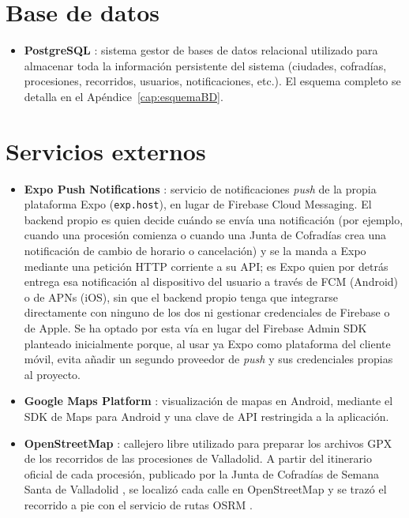 \section{Base de datos}

\begin{itemize}
    \item \textbf{PostgreSQL} \cite{postgresql}: sistema gestor de bases de datos relacional utilizado para almacenar toda la información persistente del sistema (ciudades, cofradías, procesiones, recorridos, usuarios, notificaciones, etc.). El esquema completo se detalla en el Apéndice~\ref{cap:esquemaBD}.
\end{itemize}

\section{Servicios externos}

\begin{itemize}
    \item \textbf{Expo Push Notifications} \cite{expo}: servicio de notificaciones \emph{push} de la propia plataforma Expo (\texttt{exp.host}), en lugar de Firebase Cloud Messaging. El backend propio es quien decide cuándo se envía una notificación (por ejemplo, cuando una procesión comienza o cuando una Junta de Cofradías crea una notificación de cambio de horario o cancelación) y se la manda a Expo mediante una petición HTTP corriente a su API; es Expo quien por detrás entrega esa notificación al dispositivo del usuario a través de FCM (Android) o de APNs (iOS), sin que el backend propio tenga que integrarse directamente con ninguno de los dos ni gestionar credenciales de Firebase o de Apple. Se ha optado por esta vía en lugar del Firebase Admin SDK planteado inicialmente porque, al usar ya Expo como plataforma del cliente móvil, evita añadir un segundo proveedor de \emph{push} y sus credenciales propias al proyecto.
    \item \textbf{Google Maps Platform} \cite{googlemapsapi}: visualización de mapas en Android, mediante el SDK de Maps para Android \cite{googlemapsandroid} y una clave de API restringida a la aplicación.
    \item \textbf{OpenStreetMap} \cite{openstreetmap}: callejero libre utilizado para preparar los archivos GPX de los recorridos de las procesiones de Valladolid. A partir del itinerario oficial de cada procesión, publicado por la Junta de Cofradías de Semana Santa de Valladolid \cite{jcssvaProcesiones}, se localizó cada calle en OpenStreetMap y se trazó el recorrido a pie con el servicio de rutas OSRM \cite{osrm}.
\end{itemize}

